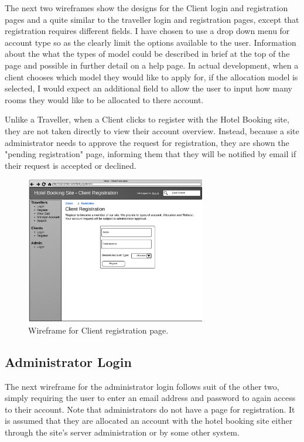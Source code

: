 \documentclass{article}
\begin{document}
The next two wireframes show the designs for the Client login and registration pages and a quite similar to the traveller login and registration pages, except that registration requires different fields. I have chosen to use a drop down menu for account type so as the clearly limit the options available to the user. Information about the what the types of model could be described in brief at the top of the page and possible in further detail on a help page. In actual development, when a client chooses which model they would like to apply for, if the allocation model is selected, I would expect an additional field to allow the user to input how many rooms they would like to be allocated to there account.

Unlike a Traveller, when a Client clicks to register with the Hotel Booking site, they are not taken directly to view their account overview. Instead, because a site administrator needs to approve the request for registration, they are shown the "pending registration" page, informing them that they will be notified by email if their request is accepted or declined.

\begin{figure}[H]
\centering
\includegraphics[width=0.7\textwidth]{img/wireframes/ClientRegister.png}
\caption{Wireframe for Client registration page.}
\label{fig:wireframe-client-register}
\end{figure}

\subsection{Administrator Login}
The next wireframe for the administrator login follows suit of the other two, simply requiring the user to enter an email address and password to again access to their account. Note that administrators do not have a page for registration. It is assumed that they are allocated an account with the hotel booking site either through the site's server administration or by some other system.
\end{document}
